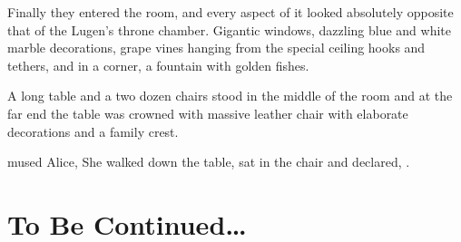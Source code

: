 Finally they entered the room, and every aspect of it looked absolutely opposite that of the Lugen's throne chamber. Gigantic windows, dazzling blue and white marble decorations, grape vines hanging from the special ceiling hooks and tethers, and in a corner, a fountain with golden fishes.

A long table and a two dozen chairs stood in the middle of the room and at the far end the table was crowned with massive leather chair with elaborate decorations and a family crest.

 mused Alice,  She walked down the table, sat in the chair and declared, .

\section{To Be Continued\dots}
